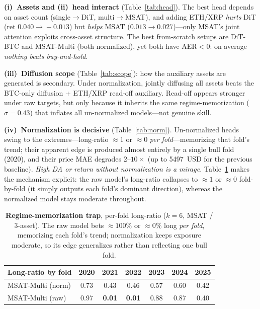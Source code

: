 \documentclass[10pt]{article}
\begin{document}
\noindent\textbf{(i)~Assets and (ii)~head interact} (Table~\ref{tab:head}). The best head depends
on asset count (single$\to$DiT, multi$\to$MSAT), and adding ETH/XRP \emph{hurts} DiT
(ret $0.040\!\to\!-0.013$) but \emph{helps} MSAT ($0.013\!\to\!0.027$)---only MSAT's joint
attention exploits cross-asset structure. The best from-scratch setups are DiT-BTC and MSAT-Multi
(both normalized), yet both have AER${<}0$: on average \emph{nothing beats buy-and-hold}.

\noindent\textbf{(iii)~Diffusion scope} (Table~\ref{tab:scope}): how the auxiliary assets are
generated is secondary. Under normalization, jointly diffusing all assets beats the BTC-only
diffusion + ETH/XRP read-off auxiliary. Read-off appears stronger under raw targets, but only
because it inherits the same regime-memorization ($\sigma{=}0.43$) that inflates all un-normalized
models---not genuine skill.

\noindent\textbf{(iv)~Normalization is decisive} (Table~\ref{tab:norm}). Un-normalized heads
swing to the extremes---long-ratio ${\approx}1$ or ${\approx}0$ \emph{per fold}---memorizing that
fold's trend; their apparent edge is produced almost entirely by a single bull fold (2020), and
their price MAE degrades $2$--$10\times$ (up to 5497~USD for the previous baseline). \emph{High DA
or return without normalization is a mirage.} Table~\ref{tab:regime} makes the mechanism explicit:
the raw model's long-ratio collapses to ${\approx}1$ or ${\approx}0$ fold-by-fold (it simply
outputs each fold's dominant direction), whereas the normalized model stays moderate throughout.

\begin{table}[htbp]
\centering\small
\caption{\textbf{Regime-memorization trap}, per-fold long-ratio ($k{=}6$, MSAT / 3-asset). The raw
model bets ${\approx}100\%$ or ${\approx}0\%$ long \emph{per fold}, memorizing each fold's trend;
normalization keeps exposure moderate, so its edge generalizes rather than reflecting one bull fold.}
\label{tab:regime}
\begin{tabular}{lcccccc}
\toprule
Long-ratio by fold & 2020 & 2021 & 2022 & 2023 & 2024 & 2025 \\ \midrule
MSAT-Multi (norm) & 0.73 & 0.43 & 0.46 & 0.57 & 0.60 & 0.42 \\
MSAT-Multi (raw)  & 0.97 & \textbf{0.01} & \textbf{0.01} & 0.88 & 0.87 & 0.40 \\
\bottomrule
\end{tabular}
\end{table}
\end{document}
